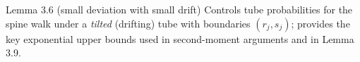 \begin{block}{Lemma 3.6 (small deviation with small drift)}
Controls tube probabilities for the spine walk under a \emph{tilted} (drifting) tube with boundaries $(r_j,s_j)$; provides the key exponential upper bounds used in second-moment arguments and in Lemma 3.9.
\end{block}
